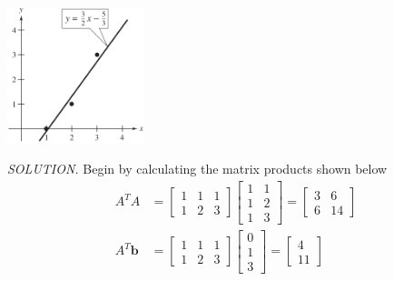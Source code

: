 \documentclass{article}
\newcommand\B{\textbf}
\newcommand\T{\textit}
\begin{document}
    \begin{minipage}{0.3\linewidth}
        \includegraphics[width = 4cm]{images/normaleq.png}
    \end{minipage}
    \begin{minipage}{0.6\linewidth}
        \T{\textcolor{blue5}{SOLUTION.}} Begin by calculating the matrix products shown below
        \begin{equation*}
            \begin{split}
                A^TA & = \begin{bmatrix}
                    1 & 1 & 1 \\
                    1 & 2 & 3
                \end{bmatrix}
                \begin{bmatrix}
                    1 & 1 \\
                    1 & 2 \\
                    1 & 3
                \end{bmatrix} =
                \begin{bmatrix}
                    3 & 6 \\
                    6 & 14
                \end{bmatrix} \\
                    A^T\B{b} &= \begin{bmatrix}
                    1 & 1 & 1\\
                    1 & 2 & 3
                \end{bmatrix}
                \begin{bmatrix}
                    0 \\ 1 \\ 3
                \end{bmatrix} =
                \begin{bmatrix}
                    4 \\ 11
                \end{bmatrix}
            \end{split}
        \end{equation*}
    \end{minipage}
\end{document}
